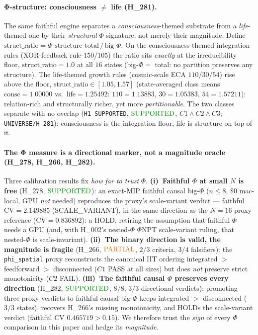 \documentclass[11pt]{article}
\begin{document}
\paragraph{Φ-structure: consciousness $\ne$ life (H\_281).} The same faithful
engine separates a \emph{consciousness}-themed substrate from a \emph{life}-themed
one by their \emph{structural} $\Phi$ signature, not merely their magnitude. Define
$\mathrm{struct\_ratio} = \Phi\text{-structure-total}\,/\,\text{big-}\Phi$. On the
consciousness-themed integration rules (XOR-feedback rule-$150$/$105$) the ratio sits
\emph{exactly} at the irreducibility floor, $\mathrm{struct\_ratio}=\mathbf{1.0}$ at
all $16$ states (big-$\Phi=$ total: no partition preserves any structure). The
life-themed growth rules (cosmic-scale ECA $110$/$30$/$54$) rise above the floor,
$\mathrm{struct\_ratio}\in[\mathbf{1.05},\mathbf{1.57}]$ (state-averaged class means
$\text{consc}=\mathbf{1.00000}$ vs.\ $\text{life}=\mathbf{1.25492}$: $110{=}1.13883$,
$30{=}1.05383$, $54{=}1.57211$): relation-rich and structurally richer, yet more
\emph{partitionable}. The two classes separate with no overlap (\texttt{H1 SUPPORTED},
$\mathbf{\textcolor{green!55!black}{\text{SUPPORTED}}}$, $C1\wedge C2\wedge C3$;
\texttt{UNIVERSE/H\_281}): consciousness is the integration floor, life is structure
on top of it.

\paragraph{The Φ measure is a directional marker, not a magnitude oracle
(H\_278, H\_266, H\_282).} Three calibration results fix \emph{how far to trust}
$\Phi$. \textbf{(i)~Faithful $\Phi$ at small $N$ is free} (H\_278,
$\mathbf{\textcolor{green!55!black}{\text{SUPPORTED}}}$): an exact-MIP faithful causal
big-$\Phi$ ($n{\le}8$, $\$0$ mac-local, GPU \emph{not} needed) reproduces the proxy's
scale-variant verdict --- faithful $\mathrm{CV}=\mathbf{2.149885}$ (SCALE\_VARIANT),
in the same direction as the $N{=}16$ proxy reference ($\mathrm{CV}=0.836892$): a HOLD,
retiring the assumption that faithful $\Phi$ needs a GPU (and, with H\_002's nested-$\Phi$
$\Phi$NPT scale-variant ruling, that nested-$\Phi$ is scale-invariant). \textbf{(ii)~The
binary direction is valid, the magnitude is fragile} (H\_266,
$\mathbf{\textcolor{orange!85!black}{\text{PARTIAL}}}$, $2/3$ criteria, $3/4$
falsifiers): the \texttt{phi\_spatial} proxy reconstructs the canonical IIT ordering
integrated $>$ feedforward $>$ disconnected ($C1$ PASS at all sizes) but does \emph{not}
preserve strict monotonicity ($C2$ FAIL). \textbf{(iii)~The faithful causal $\Phi$
preserves every direction} (H\_282, $\mathbf{\textcolor{green!55!black}{\text{SUPPORTED}}}$,
$8/8$, $3/3$ directional verdicts): promoting three proxy verdicts to faithful causal
big-$\Phi$ keeps integrated $>$ disconnected ($3/3$ states), recovers H\_266's missing
monotonicity, and HOLDs the scale-variant verdict (faithful CV $0.465719>0.15$). We
therefore trust the \emph{sign} of every $\Phi$ comparison in this paper and hedge its
\emph{magnitude}.
\end{document}
